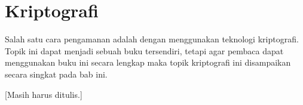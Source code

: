 \chapter{Kriptografi}
Salah satu cara pengamanan adalah dengan menggunakan teknologi kriptografi.
Topik ini dapat menjadi sebuah buku tersendiri, tetapi agar pembaca dapat
menggunakan buku ini secara lengkap maka topik kriptografi ini disampaikan
secara singkat pada bab ini. 

[Masih harus ditulis.]
